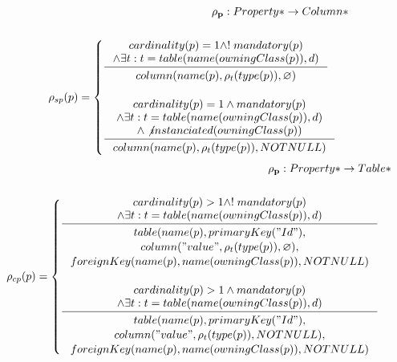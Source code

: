 \documentclass[11pt]{article}
\begin{document}
\begin{align*}
	\mathbf{\rho_p} : Property* \rightarrow Column* \\ \\
	\rho_{sp}(p) = \begin{cases}
 		\inference{cardinality(p) = 1 \wedge !\;mandatory(p)
 			\\ \wedge \exists t : t = table(name(owningClass(p)), d) 
		 }{\begin{gathered}
	  		column(name(p), \rho_t(type(p)), \varnothing )
		\end{gathered}} \\ \\
  		\inference{cardinality(p) = 1 \wedge mandatory(p)
			 \\ \wedge \exists t : t = table(name(owningClass(p)), d)
			\\ \wedge \not instanciated(owningClass(p))
		}{\begin{gathered}
 	 		column(name(p), \rho_t(type(p)), NOTNULL ) \\ 
		\end{gathered}}
 	\end{cases}
\end{align*}
\begin{align*}
	\mathbf{\rho_p} : Property* \rightarrow Table* \\ \\
	\rho_{cp}(p) = \begin{cases}
 	\inference{cardinality(p) > 1 \wedge !\;mandatory(p) \\ 
 		\wedge 	\exists t : t = table(name(owningClass(p)), d)
 		}{\begin{gathered}
 			table(name(p), primaryKey("Id"), \\ column("value", 			\rho_t(type(p)), \varnothing), \\ foreignKey(name(p), 			name(owningClass(p)), NOTNULL) \\
	\end{gathered}}\\ \\
 	\inference{ cardinality(p) > 1 \wedge mandatory(p) \\ 
 		\wedge \exists t : t = table(name(owningClass(p)), d) 
 		}{\begin{gathered}  
 			table(name(p), primaryKey("Id"), \\ 
 			column("value", \rho_t(type(p)), NOTNULL), \\ 			foreignKey(name(p), name(owningClass(p)), NOTNULL)
	 \end{gathered}}
 	\end{cases}
\end{align*}
\end{document}
